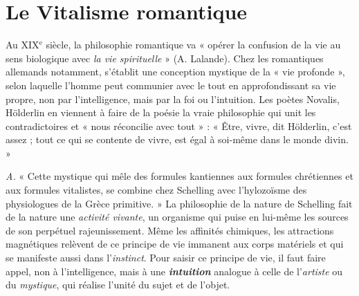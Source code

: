 \section{Le Vitalisme romantique}%
Au {\footnotesize XIX}$^\text{e}$ siècle, la philosophie
romantique va « opérer la confusion de la vie au sens biologique
avec {\it la vie spirituelle} » (A. Lalande). Chez les romantiques allemands
notamment, s’établit une conception mystique de la « vie
profonde », selon laquelle l’homme peut communier avec le tout
en approfondissant sa vie propre, non par l'intelligence, mais par la
foi ou l'intuition. Les poètes Novalis, Hölderlin en viennent à faire
de la poésie la vraie philosophie qui unit les contradictoires et « nous
réconcilie avec tout » : « Être, vivre, dit Hölderlin, c’est assez ; tout
ce qui se contente de vivre, est égal à soi-même dans le monde divin. »

{\it A.} « Cette mystique qui mêle des formules kantiennes aux formules
chrétiennes et aux formules vitalistes, se combine chez Schelling
avec l’hylozoïsme des physiologues de la Grèce primitive. » La philosophie
de la nature de Schelling fait de la nature une {\it activité vivante},
un organisme qui puise en lui-même les sources de son perpétuel
rajeunissement. Même les affinités chimiques, les attractions magnétiques
relèvent de ce principe de vie immanent aux corps matériels
et qui se manifeste aussi dans l’{\it instinct}. Pour saisir ce principe de
vie, il faut faire appel, non à l'intelligence, mais à une \textbf{\textit {intuition}} analogue
à celle de l'{\it artiste} ou du {\it mystique}, qui réalise l’unité du sujet et
de l’objet.


